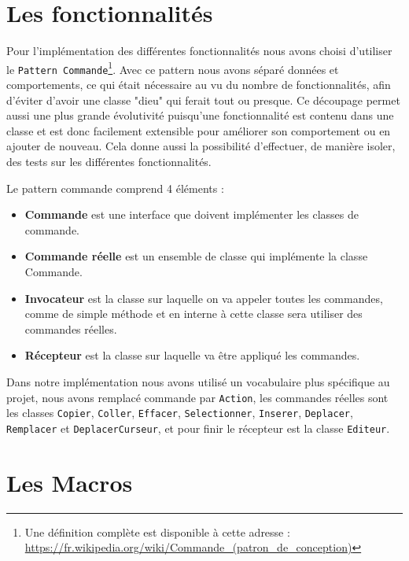 \documentclass[french]{article}
\begin{document}
\section{Les fonctionnalités}\label{sec:fonctionnalités}
Pour l'implémentation des différentes fonctionnalités nous avons choisi d'utiliser le \texttt{Pattern Commande}\footnote{Une définition complète est disponible à cette adresse : \url{https://fr.wikipedia.org/wiki/Commande_(patron_de_conception)}}. Avec ce pattern nous avons séparé données et comportements, ce qui était nécessaire au vu du nombre de fonctionnalités, afin d'éviter d'avoir une classe "dieu" qui ferait tout ou presque. Ce découpage permet aussi une plus grande évolutivité puisqu'une fonctionnalité est contenu dans une classe et est donc facilement extensible pour améliorer son comportement ou en ajouter de nouveau. Cela donne aussi la possibilité d'effectuer, de manière isoler, des tests sur les différentes fonctionnalités.

Le pattern commande comprend 4 éléments :
\begin{itemize}
	\item \textbf{Commande} est une interface que doivent implémenter les classes de commande.
	\item \textbf{Commande réelle} est un ensemble de classe qui implémente la classe Commande.
	\item \textbf{Invocateur} est la classe sur laquelle on va appeler toutes les commandes, comme de simple méthode et en interne à cette classe sera utiliser des commandes réelles.
	\item \textbf{Récepteur} est la classe sur laquelle va être appliqué les commandes.
\end{itemize}

Dans notre implémentation nous avons utilisé un vocabulaire plus spécifique au projet, nous avons remplacé commande par \texttt{Action}, les commandes réelles sont les classes \texttt{Copier}, \texttt{Coller}, \texttt{Effacer}, \texttt{Selectionner}, \texttt{Inserer}, \texttt{Deplacer}, \texttt{Remplacer} et \texttt{DeplacerCurseur}, et pour finir le récepteur est la classe \texttt{Editeur}.

\section{Les Macros}\label{sec:macros}
\end{document}
